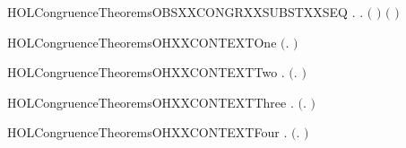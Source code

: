 \newcommand{\HOLCongruenceTheoremsOBSXXCONGRXXSUBSTXXCONTEXT}{\UseVerbatim{HOLCongruenceTheoremsOBSXXCONGRXXSUBSTXXCONTEXT}}
\begin{SaveVerbatim}{HOLCongruenceTheoremsOBSXXCONGRXXSUBSTXXSEQ}
\HOLTokenTurnstile{} \HOLSymConst{\HOLTokenForall{}} .    \HOLSymConst{\HOLTokenImp{}} \HOLSymConst{\HOLTokenForall{}}.   \HOLSymConst{\HOLTokenImp{}}  \ensuremath{(} \ensuremath{)} \ensuremath{(} \ensuremath{)}
\end{SaveVerbatim}
\newcommand{\HOLCongruenceTheoremsOBSXXCONGRXXSUBSTXXSEQ}{\UseVerbatim{HOLCongruenceTheoremsOBSXXCONGRXXSUBSTXXSEQ}}
\begin{SaveVerbatim}{HOLCongruenceTheoremsOHXXCONTEXTOne}
\HOLTokenTurnstile{}  \ensuremath{(}\HOLTokenLambda{}. \ensuremath{)}
\end{SaveVerbatim}
\newcommand{\HOLCongruenceTheoremsOHXXCONTEXTOne}{\UseVerbatim{HOLCongruenceTheoremsOHXXCONTEXTOne}}
\begin{SaveVerbatim}{HOLCongruenceTheoremsOHXXCONTEXTTwo}
\HOLTokenTurnstile{} \HOLSymConst{\HOLTokenForall{}} .   \HOLSymConst{\HOLTokenImp{}}  \ensuremath{(}\HOLTokenLambda{}. \HOLSymConst{\ensuremath{\ldotp}} \ensuremath{)}
\end{SaveVerbatim}
\newcommand{\HOLCongruenceTheoremsOHXXCONTEXTTwo}{\UseVerbatim{HOLCongruenceTheoremsOHXXCONTEXTTwo}}
\begin{SaveVerbatim}{HOLCongruenceTheoremsOHXXCONTEXTThree}
\HOLTokenTurnstile{} \HOLSymConst{\HOLTokenForall{}} .   \HOLSymConst{\HOLTokenImp{}}  \ensuremath{(}\HOLTokenLambda{}.   \HOLSymConst{\ensuremath{+}} \ensuremath{)}
\end{SaveVerbatim}
\newcommand{\HOLCongruenceTheoremsOHXXCONTEXTThree}{\UseVerbatim{HOLCongruenceTheoremsOHXXCONTEXTThree}}
\begin{SaveVerbatim}{HOLCongruenceTheoremsOHXXCONTEXTFour}
\HOLTokenTurnstile{} \HOLSymConst{\HOLTokenForall{}} .   \HOLSymConst{\HOLTokenImp{}}  \ensuremath{(}\HOLTokenLambda{}.  \HOLSymConst{\ensuremath{+}}  \ensuremath{)}
\end{SaveVerbatim}
